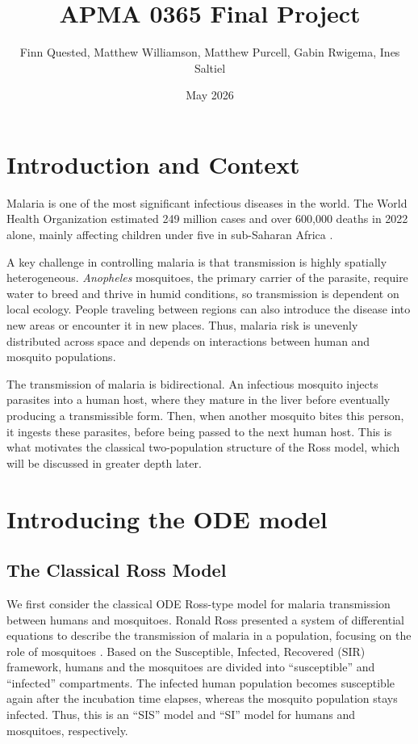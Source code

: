 \documentclass[12pt]{article}
\title{APMA 0365 Final Project}
\author{Finn Quested, Matthew Williamson, Matthew Purcell, Gabin Rwigema, Ines Saltiel}
\date{May 2026}
\begin{document}
\begin{titlepage}
    \centering
    \vspace*{\fill}
    {\Huge \textbf{Extending the Ross Malaria Model to Reaction-Diffusion PDEs: Spatial Dynamics, Diffusion Thresholds, and Mosquito Control} \\[0.5cm]
    {\Large Finn Quested, Matthew Williamson, Matthew Purcell, Gabin Rwigema, Ines Saltiel} \\[0.4cm]
    May 6, 2026
    \vfill
\end{titlepage}
\newpage
\tableofcontents
\newpage
\section{Introduction and Context}

Malaria is one of the most significant infectious diseases in the world. The World Health Organization estimated 249 million cases and over 600,000 deaths in 2022 alone, mainly affecting children under five in sub-Saharan Africa \cite{Qu2023}. 

A key challenge in controlling malaria is that transmission is highly spatially heterogeneous. \textit{Anopheles} mosquitoes, the primary carrier of the parasite, require water to breed and thrive in humid conditions, so transmission is dependent on local ecology. People traveling between regions can also introduce the disease into new areas or encounter it in new places. Thus, malaria risk is unevenly distributed across space and depends on interactions between human and mosquito populations.

The transmission of malaria is bidirectional. An infectious mosquito injects parasites into a human host, where they mature in the liver before eventually producing a transmissible form. Then, when another mosquito bites this person, it ingests these parasites, before being passed to the next human host. This is what motivates the classical two-population structure of the Ross model, which will be discussed in greater depth later.

\section{Introducing the ODE model}

\subsection{The Classical Ross Model}

We first consider the classical ODE Ross-type model for malaria transmission between humans and mosquitoes. Ronald Ross presented a system of differential equations to describe the transmission of malaria in a population, focusing on the role of mosquitoes \cite{Ross1911}. Based on the Susceptible, Infected, Recovered (SIR) framework, humans and the mosquitoes are divided into “susceptible” and “infected” compartments. The infected human population becomes susceptible again after the incubation time elapses, whereas the mosquito population stays infected. Thus, this is an “SIS” model and “SI” model for humans and mosquitoes, respectively. 
\end{document}
